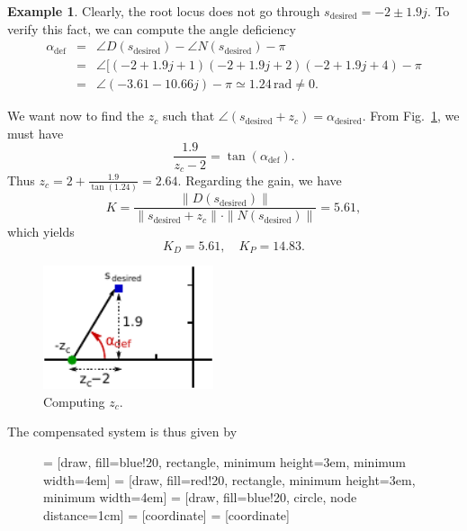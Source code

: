 \documentclass[a4paper,11pt]{report}
\theoremstyle{definition}
\newcommand{\des}{\textrm{desired}}
\newcommand{\defi}{\mathrm{def}}
\newtheorem{mdexample}{Example}
\newenvironment{example}%
  {\vspace{0.1cm}\begin{mdframed}[backgroundcolor=lightgray]\begin{mdexample}}%
  {\end{mdexample}\end{mdframed}\vspace{0.1cm}}
\begin{document}
\begin{example}
 Clearly, the root locus does not go through $s_\des=-2\pm1.9j$.  To
 verify this fact, we can compute the angle deficiency
  \begin{eqnarray}
    \label{eq:defi}
    \alpha_\defi &=& \angle D(s_\des)-\angle N(s_\des) - \pi
    \nonumber\\
    &=& \angle [(-2+1.9j+1)(-2+1.9j+2)(-2+1.9j+4) - \pi \nonumber\\
    &=& \angle(-3.61-10.66j) - \pi \simeq 1.24\,\mathrm{rad}\neq 0.\nonumber
  \end{eqnarray}

  We want now to find the $z_c$ such that
  $\angle(s_\des+z_c)=\alpha_\des$. From Fig.~\ref{fig:zc}, we must
  have
  \[
  \frac{1.9}{z_c-2}=\tan(\alpha_\defi).
  \]
  Thus $z_c=2+\frac{1.9}{\tan(1.24)}=2.64$. Regarding the gain, we have
  \[
  K = \frac{\|D(s_\des)\|}{\|s_\des+z_c\|\cdot\|N(s_\des)\|} = 5.61,
  \]
  which yields
  \[
  K_D = 5.61,\quad K_P=14.83.
  \]

  \begin{figure}[H]
    \centering
    \includegraphics[width=5cm]{fig/adef-pd.pdf}
    \caption{Computing $z_c$.}
    \label{fig:zc}
  \end{figure}

  The compensated system is thus given by

  \begin{figure}[H]
    \centering
     = [draw, fill=blue!20, rectangle, minimum height=3em, minimum width=4em]
     = [draw, fill=red!20, rectangle, minimum height=3em, minimum width=4em]
     = [draw, fill=blue!20, circle, node distance=1cm]
     = [coordinate]
     = [coordinate]
  \end{figure}


\end{example}
\end{document}
